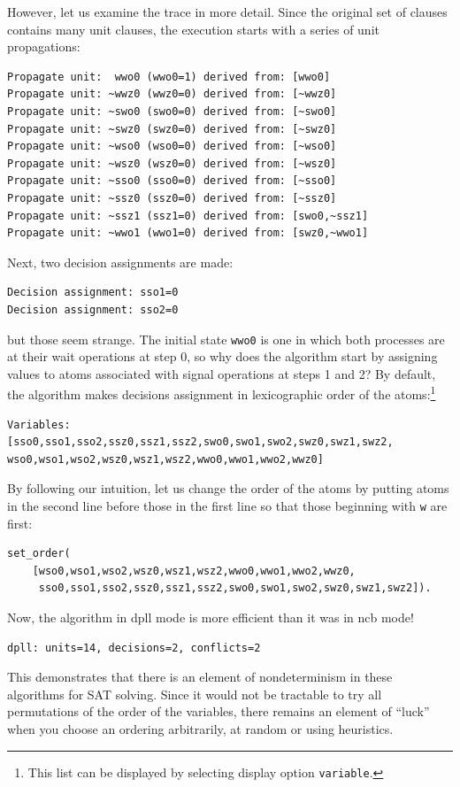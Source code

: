 \documentclass[11pt]{report}
\newcommand*{\p}[1]{\textup{\texttt{#1}}}
\begin{document}
However, let us examine the trace in more detail. Since the original set
of clauses contains many unit clauses, the execution starts with a
series of unit propagations:
\begin{verbatim}
Propagate unit:  wwo0 (wwo0=1) derived from: [wwo0]
Propagate unit: ~wwz0 (wwz0=0) derived from: [~wwz0]
Propagate unit: ~swo0 (swo0=0) derived from: [~swo0]
Propagate unit: ~swz0 (swz0=0) derived from: [~swz0]
Propagate unit: ~wso0 (wso0=0) derived from: [~wso0]
Propagate unit: ~wsz0 (wsz0=0) derived from: [~wsz0]
Propagate unit: ~sso0 (sso0=0) derived from: [~sso0]
Propagate unit: ~ssz0 (ssz0=0) derived from: [~ssz0]
Propagate unit: ~ssz1 (ssz1=0) derived from: [swo0,~ssz1]
Propagate unit: ~wwo1 (wwo1=0) derived from: [swz0,~wwo1]
\end{verbatim}
Next, two decision assignments are made:
\begin{verbatim}
Decision assignment: sso1=0
Decision assignment: sso2=0
\end{verbatim}
but those seem strange. The initial state \p{wwo0} is one in which both
processes are at their wait operations at step 0, so why does the
algorithm start by assigning values to atoms associated with signal
operations at steps 1 and 2? By default, the algorithm makes decisions
assignment in lexicographic order of the atoms:\footnote{This list can
be displayed by selecting display option \p{variable}.}
\begin{verbatim}
Variables: [sso0,sso1,sso2,ssz0,ssz1,ssz2,swo0,swo1,swo2,swz0,swz1,swz2,
wso0,wso1,wso2,wsz0,wsz1,wsz2,wwo0,wwo1,wwo2,wwz0]
\end{verbatim}
By following our
intuition, let us change the order of the atoms by putting atoms in the
second line before those in the first line so that those beginning with
\p{w} are first:
\begin{verbatim}
set_order(
    [wso0,wso1,wso2,wsz0,wsz1,wsz2,wwo0,wwo1,wwo2,wwz0,
     sso0,sso1,sso2,ssz0,ssz1,ssz2,swo0,swo1,swo2,swz0,swz1,swz2]).
\end{verbatim}
Now, the algorithm in dpll mode is more efficient than it was in ncb mode!
\begin{verbatim}
dpll: units=14, decisions=2, conflicts=2
\end{verbatim}

This demonstrates that there is an element of nondeterminism in these
algorithms for SAT solving. Since it would not be tractable to try all
permutations of the order of the variables, there remains an element of
``luck'' when you choose an ordering arbitrarily, at random or using
 heuristics.



\end{document}
